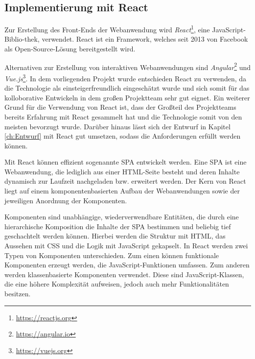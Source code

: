 \subsection{Implementierung mit React}
Zur Erstellung des Front-Ends der Webanwendung wird \textit{React}\footnote{\url{https://reactjs.org}}, eine JavaScript-Biblio-thek, verwendet.
React ist ein Framework, welches seit 2013 von Facebook als Open-Source-Lösung bereitgestellt wird.\autocite[Vgl.][S. 3]{React2019} 

Alternativen zur Erstellung von interaktiven Webanwendungen sind \textit{Angular}\footnote{\url{https://angular.io}} und \textit{Vue.js}\footnote{\url{https://vuejs.org}}. In dem vorliegenden Projekt wurde entschieden React zu verwenden, da die Technologie als einsteigerfreundlich eingeschätzt wurde und sich somit für das kolloborative Entwickeln in dem großen Projektteam sehr gut eignet. 
Ein weiterer Grund für die Verwendung von React ist, dass der Großteil des Projektteams bereits Erfahrung mit React gesammelt hat und die Technologie somit von den meisten bevorzugt wurde.
Darüber hinaus lässt sich der Entwurf in Kapitel \vref{ch:Entwurf} mit React gut umsetzen, sodass die Anforderungen erfüllt werden können. 

Mit React können effizient sogenannte \ac{SPA} entwickelt werden. 
Eine \ac{SPA} ist eine Webanwendung, die lediglich aus einer \acs{HTML}-Seite besteht und deren Inhalte dynamisch zur Laufzeit nachgeladen bzw. erweitert werden.
Der Kern von React liegt auf einem komponentenbasierten Aufbau der Webanwendungen sowie der jeweiligen Anordnung der Komponenten.\autocite[Vgl.][S. 3]{React2019} 

Komponenten sind unabhängige, wiederverwendbare Entitäten, die durch eine hierarchische Komposition die Inhalte der \ac{SPA} bestimmen und beliebig tief geschachtelt werden können.
Hierbei werden die Struktur mit \acs{HTML}, das Aussehen mit \ac{CSS} und die Logik mit JavaScript gekapselt.
In React werden zwei Typen von Komponenten unterschieden. 
Zum einen können funktionale Komponenten erzeugt werden, die JavaScript-Funktionen umfassen. 
Zum anderen werden klassenbasierte Komponenten verwendet. 
Diese sind JavaScript-Klassen, die eine höhere Komplexität aufweisen, jedoch auch mehr Funktionalitäten besitzen. 

